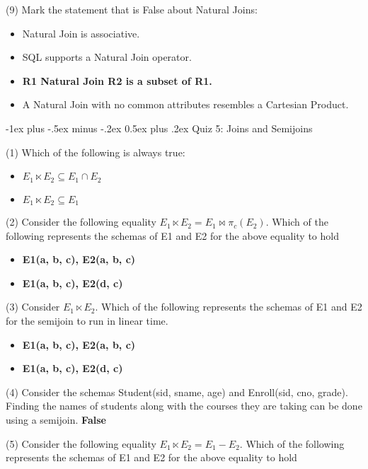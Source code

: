 \documentclass[10pt,landscape]{article}
\makeatletter
\newcommand{\ans}[1]{{\color{purple} \textbf{#1}}}
\newcommand{\semijoin}{\ensuremath{\ltimes}}
\renewcommand{\section}{\@startsection{section}{1}{0mm}%
                                {-1ex plus -.5ex minus -.2ex}%
                                {0.5ex plus .2ex}%
                                {\normalfont\large\bfseries}}
\makeatother
\begin{document}
\begin{multicols}{4}
(9) Mark the statement that is False about Natural Joins:

\begin{itemize}
	\item Natural Join is associative. 
	\item SQL supports a Natural Join operator. 
	\item \ans{R1 Natural Join R2 is a subset of R1.} 
	\item A Natural Join with no common attributes resembles a Cartesian Product. 
\end{itemize} 

\section{Quiz 5: Joins and Semijoins}

(1) Which of the following is always true:

\begin{itemize}
	\item $E_1 \semijoin E_2 \subseteq E_1 \cap E_2$
	\item \ans{$E_1 \semijoin E_2 \subseteq E_1$}
\end{itemize}

(2) Consider the following equality $E_1 \semijoin E_2 = E_1 \bowtie \pi_c (E_2)$. Which of the following represents the schemas of E1 and E2 for the above equality to hold

\begin{itemize}
	\item \ans{E1(a, b, c), E2(a, b, c)}
	\item \ans{E1(a, b, c), E2(d, c)}
\end{itemize}

(3) Consider $E_1 \semijoin E_2$. Which of the following represents the schemas of E1 and E2 for the semijoin to run in linear time.

\begin{itemize}
	\item \ans{E1(a, b, c), E2(a, b, c)}
	\item \ans{E1(a, b, c), E2(d, c)}
\end{itemize}

(4) Consider the schemas Student(sid, sname, age) and Enroll(sid, cno, grade). Finding the names of students along with the courses they are taking can be done using a semijoin. \ans{False}

(5) Consider the following equality  $E_1 \semijoin E_2 = E_1 - E_2$. Which of the following represents the schemas of E1 and E2 for the above equality to hold


\end{multicols}
\end{document}
